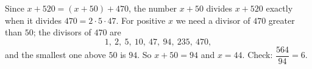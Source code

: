 Since $x+520=(x+50)+470$, the number $x+50$ divides $x+520$ exactly when it divides $470=2\cdot5\cdot47$. For positive $x$ we need a divisor of $470$ greater than $50$; the divisors of $470$ are
\[
1,\ 2,\ 5,\ 10,\ 47,\ 94,\ 235,\ 470,
\]
and the smallest one above $50$ is $94$. So $x+50=94$ and $x=\boxed{44}$. Check: $\dfrac{564}{94}=6$.
